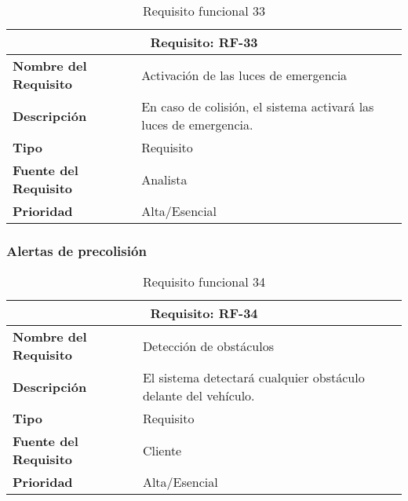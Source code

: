 \begin{table}[H]
\begin{center}
\begin{tabular}{p{} p{7cm}}
\multicolumn{2}{c}{\textbf{Requisito: RF-33} } \\
\hline \hline
\textbf{Nombre del Requisito} & Activación de las luces de emergencia\\
\hline
\textbf{Descripción} & En caso de colisión, el sistema activará las luces de emergencia.\\
\hline
\textbf{Tipo} & Requisito  \\
\hline
\textbf{Fuente del Requisito} & Analista  \\
\hline
\textbf{Prioridad} & Alta/Esencial  \\ \hline
\end{tabular}
\caption{Requisito funcional 33}
\label{tab:RF-33}
\end{center}
\end{table}

\clearpage
\subsubsection{Alertas de precolisión}

\begin{table}[H]
\begin{center}
\begin{tabular}{p{} p{7cm}}
\multicolumn{2}{c}{\textbf{Requisito: RF-34} } \\
\hline \hline
\textbf{Nombre del Requisito} & Detección de obstáculos\\
\hline
\textbf{Descripción} &  El sistema detectará cualquier obstáculo delante del vehículo.\\
\hline
\textbf{Tipo} & Requisito  \\
\hline
\textbf{Fuente del Requisito} & Cliente  \\
\hline
\textbf{Prioridad} & Alta/Esencial \\ \hline
\end{tabular}
\caption{Requisito funcional 34}
\label{tab:RF-34}
\end{center}
\end{table}

